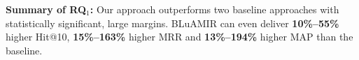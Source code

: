 \documentclass[sigconf,review,anonymous]{acmart}
\begin{document}
\begin{framed}
	\noindent
	\textbf{Summary of RQ$_1$:} Our approach outperforms two baseline approaches \cite{vector-space-model,MarcusLSI} with statistically significant, large margins. BLuAMIR can even deliver \textbf{10\%--55\%} higher Hit@10, \textbf{15\%--163\%} higher MRR and \textbf{13\%--194\%} higher MAP than the baseline.  
\end{framed}
%
\end{document}
